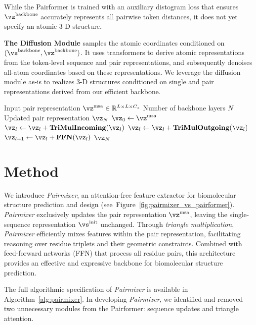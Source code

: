 \documentclass{article} %
\renewcommand{\paragraph}[1]{\vspace{1.25mm}\noindent\textbf{#1}}
\newcommand{\reffig}[1]{Figure~\ref{fig:#1}}
\newcommand{\refalg}[1]{Algorithm~\ref{alg:#1}}
\newcommand{\lblalg}[1]{\label{alg:#1}}
\def\name{{\textit{Pairmixer}}\xspace}
\begin{document}
While the Pairformer is trained with an auxiliary distogram loss that ensures $\vz^{\text{backbone}}$ accurately represents all pairwise token distances, it does not yet specify an atomic 3-D structure.

\paragraph{The Diffusion Module} samples the atomic coordinates conditioned on $(\vs^{\text{backbone}}, \vz^{\text{backbone}})$.
It uses transformers to derive atomic representations from the token-level sequence and pair representations, and subsequently denoises all-atom coordinates based on these representations.
We leverage the diffusion module as-is to realizes 3-D structures conditioned on single and pair representations derived from our efficient backbone.


\begin{algorithm}[t]
\caption{\name Backbone}
\lblalg{pairmixer}
\begin{algorithmic}[1]
\REQUIRE Input pair representation $\vz^{\text{msa}} \in \mathbb{R}^{L \times L \times C_z}$
\REQUIRE Number of backbone layers $N$
\ENSURE Updated pair representation $\vz_N$
\STATE $\vz_0 \leftarrow \vz^{\text{msa}}$
    \STATE $\vz_l \leftarrow \vz_l + \mathbf{TriMulIncoming}(\vz_l)$
    \STATE $\vz_l \leftarrow \vz_l + \mathbf{TriMulOutgoing}(\vz_l)$
    \STATE $\vz_{l+1} \leftarrow \vz_l + \mathbf{FFN}(\vz_l)$
\ENDFOR
\RETURN $\vz_N$
\end{algorithmic}
\end{algorithm}

\section{Method}
We introduce \name, an attention-free feature extractor for biomolecular structure prediction and design (see~\reffig{pairmixer_vs_pairformer}).
\name exclusively updates the pair representation $\vz^{\text{msa}}$, leaving the single-sequence representation $\vs^{\text{init}}$ unchanged.
Through \textit{triangle multiplication}, \name efficiently mixes features within the pair representation, facilitating reasoning over residue triplets and their geometric constraints.
Combined with feed-forward networks (FFN) that process all residue pairs, this architecture provides an effective and expressive backbone for biomolecular structure prediction.

The full algorithmic specification of \name is available in \refalg{pairmixer}.
In developing \name, we identified and removed two unnecessary modules from the Pairformer: sequence updates and triangle attention.
\end{document}
